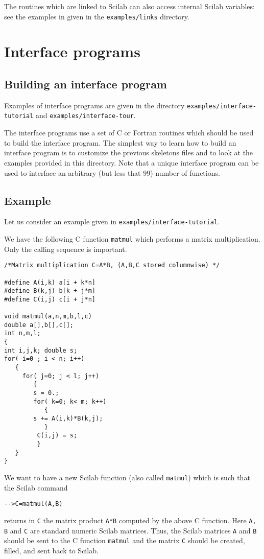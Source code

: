 The routines which are linked to Scilab can also access internal 
Scilab variables: see the examples in given in the {\tt examples/links}
directory.

\section{Interface programs}

\subsection{Building an interface program}
Examples of interface programs are given in the directory 
{\tt examples/interface-tutorial} and {\tt examples/interface-tour}. 

The interface programs use a set of C or 
Fortran routines which should be used to build the interface program.
The simplest way to learn how to build an interface program is to
customize the previous skeletons files and to look at the examples
provided in this directory. 
Note that a unique interface program can be used to interface an 
arbitrary (but less that $99$) number of functions.

\subsection{Example}
\label{interface}
Let us consider an example given in {\tt examples/interface-tutorial}.

We have the following C function \verb!matmul! which performs 
a matrix multiplication. Only the calling sequence is important.
\scriptsize
\begin{verbatim}
/*Matrix multiplication C=A*B, (A,B,C stored columnwise) */

#define A(i,k) a[i + k*n]
#define B(k,j) b[k + j*m]
#define C(i,j) c[i + j*n]

void matmul(a,n,m,b,l,c)
double a[],b[],c[];
int n,m,l;
{
int i,j,k; double s;
for( i=0 ; i < n; i++)
   {
     for( j=0; j < l; j++)
        {
        s = 0.;
        for( k=0; k< m; k++)
           {
	    s += A(i,k)*B(k,j);
           }
         C(i,j) = s;
         }
   }
}
\end{verbatim}
\normalsize

We want to have a new Scilab function (also called \verb!matmul!)
which is such that the Scilab command 
\begin{verbatim}
-->C=matmul(A,B)
\end{verbatim}
returns in \verb!C! the matrix product \verb!A*B! computed
by the above C function. Here \verb!A, B! and \verb!C! are standard
numeric Scilab matrices. Thus, the Scilab matrices \verb!A! and \verb!B! 
should be sent to the C function \verb!matmul! and the matrix 
\verb!C! should be created, filled, and sent back to Scilab.


